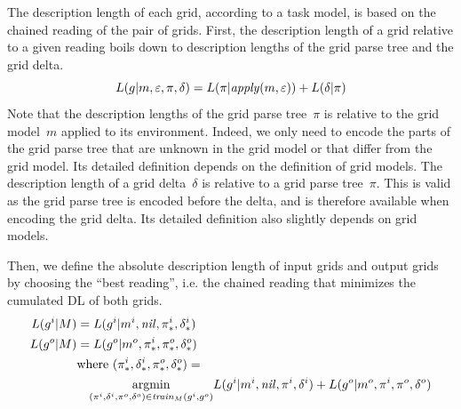 \documentclass[a4paper]{llncs}
\newcommand{\binder}[2]{\underset{#2}{#1}}
\begin{document}
The description length of each grid, according to a task model, is
based on the chained reading of the pair of grids. First, the
description length of a grid relative to a given reading boils down to
description lengths of the grid parse tree and the grid delta.
\[ L(g|m,\varepsilon,\pi,\delta) = L(\pi|{\it apply}(m,\varepsilon)) +
  L(\delta|\pi) \]
%
Note that the description lengths of the grid parse
tree~$\pi$ is relative to the grid model~$m$ applied to its
environment. Indeed, we only need to encode the parts of the grid
parse tree that are unknown in the grid model or that differ from the
grid model. Its detailed definition depends on the definition of grid
models.
%
The description length of a grid delta~$\delta$ is relative to a grid
parse tree~$\pi$. This is valid as the grid parse tree is encoded
before the delta, and is therefore available when encoding the grid
delta. Its detailed definition also slightly depends on grid models.

Then, we define the absolute description length of input grids and
output grids by choosing the ``best reading'', i.e. the chained
reading that minimizes the cumulated DL of both grids.
\begin{align*}
  L(g^i|M) & = L(g^i|m^i,{\it nil},\pi^i_*,\delta^i_*) \\
  L(g^o|M) & = L(g^o|m^o,\pi^i_*,\pi^o_*,\delta^o_*) \\
  & \textrm{where~} (\pi^i_*,\delta^i_*,\pi^o_*,\delta^o_*) =\\
  & \quad \binder{\operatorname{argmin}}{(\pi^i,\delta^i,\pi^o,
  \delta^o) \in {\it train}_M(g^i,g^o)} L(g^i|m^i,{\it nil},\pi^i,\delta^i) + L(g^o|m^o,\pi^i,\pi^o,\delta^o)
%
\end{align*}
\end{document}
